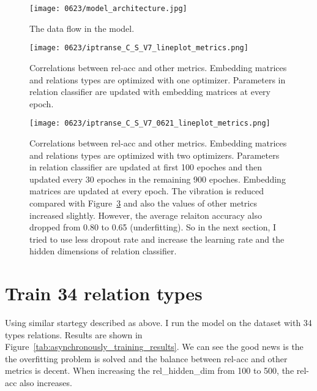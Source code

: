     \begin{figure}[!ht]
        \centering
        \texttt{[image: 0623/model\_architecture.jpg]}
        \caption{\label{fig:model_architecture} The data flow in the model.}
    \end{figure}
\begin{figure}[H]
    \centering
    \texttt{[image: 0623/iptranse\_C\_S\_V7\_lineplot\_metrics.png]}
    \caption{\label{fig:iptranse_C_S_V7_lineplot_metrics} Correlations between rel-acc and other metrics. Embedding matrices and relations types are optimized with one optimizer. Parameters in relation classifier are updated with embedding matrices at every epoch.}
\end{figure}

\begin{figure}[H]
    \centering
    \texttt{[image: 0623/iptranse\_C\_S\_V7\_0621\_lineplot\_metrics.png]}
    \caption{\label{fig:iptranse_C_S_V7_0621_lineplot_metrics} Correlations between rel-acc and other metrics. Embedding matrices and relations types are optimized with two optimizers. Parameters in relation classifier are updated at first 100 epoches and then updated every 30 epoches in the remaining 900 epoches. Embedding matrices are updated at every epoch. The vibration is reduced compared with Figure~\ref{fig:iptranse_C_S_V7_0621_lineplot_metrics} and also the values of other metrics increased slightly. However, the average relaiton accuracy also dropped from 0.80 to 0.65 (underfitting). So in the next section, I tried to use less dropout rate and increase the learning rate and the hidden dimensions of relation classifier.}
\end{figure}
\clearpage

\section{Train 34 relation types}

Using similar startegy described as above. I run the model on the dataset with 34 types relations. Results are shown in Figure~\ref{tab:asynchronously_training_results}.
We can see the good news is the the overfitting problem is solved and the balance between rel-acc and other metrics is decent. When increasing the rel\_hidden\_dim from 100 to 500, the rel-acc also increases. 

